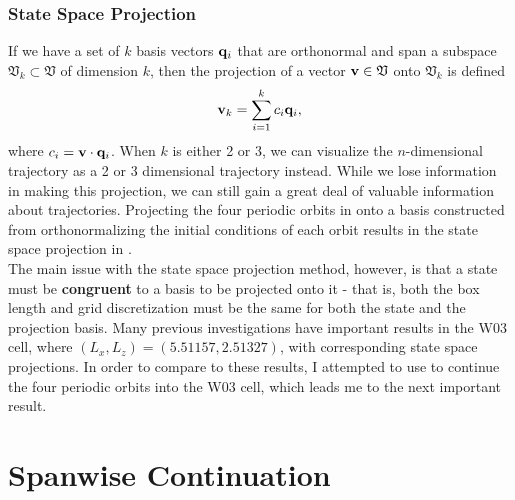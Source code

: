 \subsubsection{State Space Projection}
If we have a set of $k$ basis vectors $\mathbf{q}_i$ that are orthonormal and span a subspace $\mathfrak{V}_k \subset \mathfrak{V}$ of dimension $k$, then the projection of a vector $\mathbf{v} \in \mathfrak{V}$ onto $\mathfrak{V}_k$ is defined 
\begin{equation}
\Vector{v}_k = \sum{i = 1}{k}{c_i \Vector{q}_i},
\end{equation}
where $c_i = \mathbf{v} \cdot \mathbf{q}_i$. When $k$ is either 2 or 3, we can visualize the $n$-dimensional trajectory as a 2 or 3 dimensional trajectory instead. While we lose information in making this projection, we can still gain a great deal of valuable information about trajectories. Projecting the four periodic orbits in  onto a basis constructed from orthonormalizing the initial conditions of each orbit results in the state space projection in .\\

 The main issue with the state space projection method, however, is that a state must be {\bf congruent} to a basis to be projected onto it - that is, both the box length and grid discretization must be the same for both the state and the projection basis. Many previous investigations have important results in the W03 cell, where $(L_x,L_z) = (5.51157,2.51327)$, with corresponding state space projections. In order to compare to these results, I attempted to use  to continue the four periodic orbits into the W03 cell, which leads me to the next important result.

\section{Spanwise Continuation}

